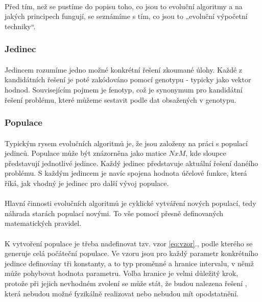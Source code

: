 \documentclass[bc,male,java,dept460]{diploma}		%
\begin{document}
\paragraph*{}
Před tím, než se pustíme do popisu toho, co jsou to evoluční algoritmy a na jakých principech fungují, se seznámíme s tím, co jsou to „evoluční výpočetní techniky“.

\subsubsection{Jedinec}
\paragraph*{}
Jedincem rozumíme jedno možné konkrétní řešení zkoumané úlohy. Každé z kandidátních řešení je poté zakódováno pomocí genotypu - typicky jako vektor hodnod. Souvisejícím pojmem je fenotyp, což je synonymum pro kandidátní řešení problému, které můžeme sestavit podle dat obsažených v genotypu.

\subsubsection{Populace}
\paragraph*{}
Typickým rysem evolučních algoritmů je, že jsou založeny na práci s populací jedinců. Populace může být znázorněna jako matice $NxM$, kde sloupce představují jednotlivé jedince. Každý jedinec představuje aktuální řešení danéího problému. S každým jedincem je navíc spojena hodnota účelové funkce, která říká, jak vhodný je jedinec pro další vývoj populace.

\paragraph*{}
Hlavní činnosti evolučních algoritmů je cyklické vytváření nových populací, tedy náhrada starách populací novými. To vše pomocí přesně definovaných matematických pravidel.

\paragraph*{}
K vytvoření populace je třeba nadefinovat tzv. vzor \ref{eq:vzor}., podle kterého se generuje celá počáteční populace. Ve vzoru jsou pro každý parametr konkrétního jedince definovány tři konstanty, a to typ proměnné a hranice intervalu, v němž může pohybovat hodnota parametru. Volba hranice je velmi důležitý krok, protože při jejich nevhodném zvolení se může stát, že budou nalezena řešení , která nebudou možné fyzikálně realizovat nebo nebudou mít opodstatnění. 
\end{document}
